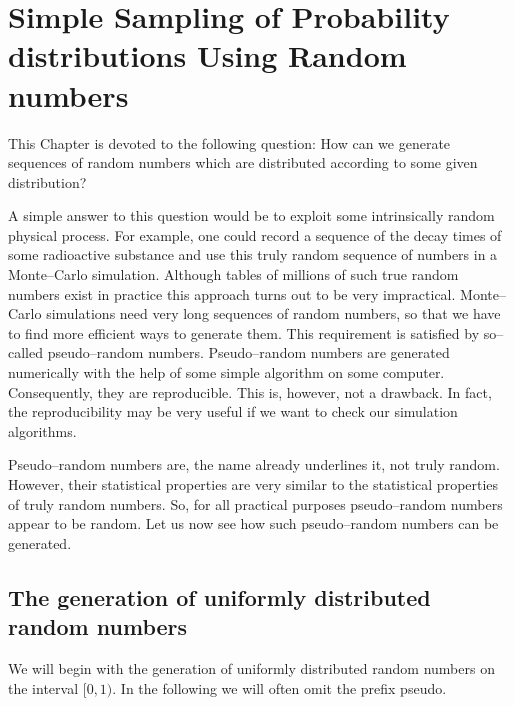 \chapter{Simple Sampling of Probability distributions Using Random numbers}
This Chapter is devoted to the following question: How can we 
generate sequences of random numbers which are distributed 
according to some given distribution?

A simple answer to this question would be to exploit some 
intrinsically random physical process. For example, one could 
record a sequence of the decay times of some radioactive substance 
and use this truly random sequence of numbers in a Monte--Carlo
simulation. Although tables of millions of such true random 
numbers exist in practice this approach turns out to be very
impractical. Monte--Carlo simulations need very long sequences of 
random numbers, so that we have to find more efficient ways to 
generate them. This requirement is satisfied 
by so--called pseudo--random numbers.
Pseudo--random numbers are generated numerically with the help of 
some simple algorithm on some computer. Consequently, they are
reproducible. This is, however, not a drawback. In fact, the 
reproducibility may be very useful if we want to check our 
simulation algorithms. 

Pseudo--random numbers are, the name already underlines it, not 
truly random. However, their statistical properties are very 
similar to the statistical properties of truly random numbers. So, 
for all practical purposes pseudo--random numbers appear to be 
random. Let us now see how such pseudo--random numbers can be 
generated.

\section{The generation of uniformly distributed random numbers}
We will begin with the generation of uniformly distributed random 
numbers on the interval $[0,1)$. In the following we will often 
omit the prefix pseudo. 

